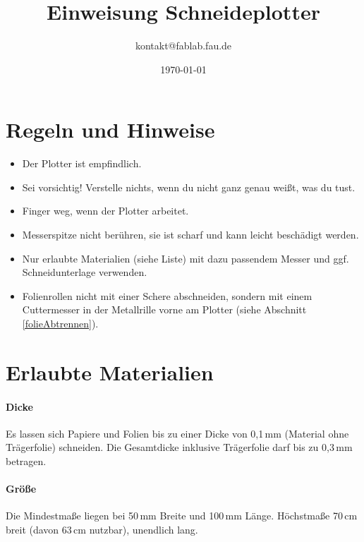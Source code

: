 \documentclass{\basedir/fablab-document}
\date{\today}
\author{kontakt@fablab.fau.de}
\title{Einweisung Schneideplotter}
\begin{document}
\maketitle
\section{Regeln und Hinweise}
\begin{itemize}
 \item Der Plotter ist empfindlich.
 \item Sei vorsichtig! Verstelle nichts, wenn du nicht ganz genau weißt, was du tust.
 \item Finger weg, wenn der Plotter arbeitet.
 \item Messerspitze nicht berühren, sie ist scharf und kann leicht beschädigt werden.
 \item Nur erlaubte Materialien (siehe Liste) mit dazu passendem Messer und ggf. Schneidunterlage verwenden.
 \item Folienrollen nicht mit einer Schere abschneiden, sondern mit einem Cuttermesser in der Metallrille vorne am Plotter (siehe Abschnitt \ref{folieAbtrennen}).
\end{itemize}

\newpage
\setcounter{tocdepth}{2} %
{\linespread{1}\selectfont\tableofcontents} %
\newpage

\section{Erlaubte Materialien}
\paragraph{Dicke}
Es lassen sich Papiere und Folien bis zu einer Dicke von 0,1\,mm (Material ohne Trägerfolie) schneiden.
Die Gesamtdicke inklusive Trägerfolie darf bis zu 0,3\,mm betragen.

\paragraph{Größe}
Die Mindestmaße liegen bei 50\,mm Breite und 100\,mm Länge.
Höchstmaße 70\,cm breit (davon 63\,cm nutzbar), unendlich lang.
\end{document}
